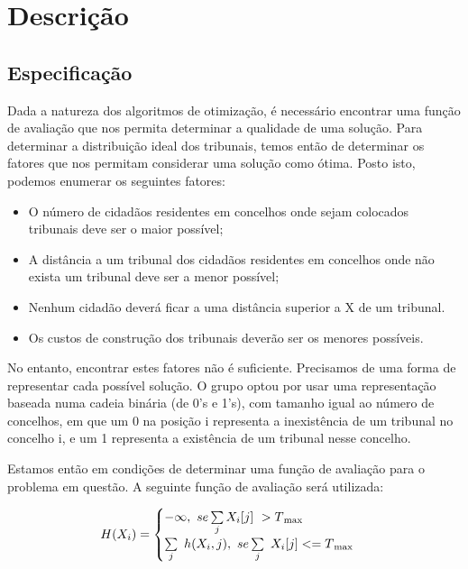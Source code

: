 \documentclass[11pt,a4paper,reqno]{article}
\numberwithin{equation}{section}
\begin{document}

\newpage

\section{Descrição} 
\subsection{Especificação} \label{introduction}

Dada a natureza dos algoritmos de otimização, é necessário encontrar uma função de avaliação que nos permita determinar a qualidade de uma solução. Para determinar a distribuição ideal dos tribunais, temos então de determinar os fatores que nos permitam considerar uma solução como ótima. Posto isto, podemos enumerar os seguintes fatores:

\begin{itemize}
\item O número de cidadãos residentes em concelhos onde sejam colocados tribunais deve ser o maior possível;
\item A distância a um tribunal dos cidadãos residentes em concelhos onde não exista um tribunal deve ser a menor possível;
\item Nenhum cidadão deverá ficar a uma distância superior a X de um tribunal.
\item Os custos de construção dos tribunais deverão ser os menores possíveis.
\end{itemize}

No entanto, encontrar estes fatores não é suficiente. Precisamos de uma forma de representar cada possível solução. O grupo optou por usar uma representação baseada numa cadeia binária (de 0's e 1's), com tamanho igual ao número de concelhos, em que um 0 na posição i representa a inexistência de um tribunal no concelho i, e um 1 representa a existência de um tribunal nesse concelho.

Estamos então em condições de determinar uma função de avaliação para o problema em questão. A seguinte função de avaliação será utilizada:

\begin{equation}
    H(X_i) = \begin{cases}
    -\infty ,\ se \sum\limits_{j}X_i[j]\ > T\textsubscript{max} \\
    \sum\limits_{j}\ h(X_i, j), \ se \sum\limits_{j}\ X_i[j] <= T\textsubscript{max}\\
    \end{cases}
\end{equation}
\end{document}

